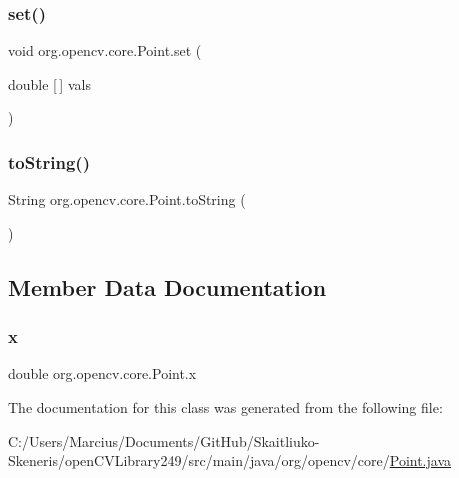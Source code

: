 \mbox{\label{classorg_1_1opencv_1_1core_1_1_point_aee7038884db6b7d0e8d0026836c8a286}} 
\subsubsection{\texorpdfstring{set()}{set()}}
{\footnotesize\ttfamily void org.\+opencv.\+core.\+Point.\+set (\begin{DoxyParamCaption}\item[{double \mbox{[}$\,$\mbox{]}}]{vals }\end{DoxyParamCaption})}

\mbox{\label{classorg_1_1opencv_1_1core_1_1_point_ac99f88cb353d8f6e47f28bd444cf9dec}} 
\subsubsection{\texorpdfstring{to\+String()}{toString()}}
{\footnotesize\ttfamily String org.\+opencv.\+core.\+Point.\+to\+String (\begin{DoxyParamCaption}{ }\end{DoxyParamCaption})}



\subsection{Member Data Documentation}
\mbox{\label{classorg_1_1opencv_1_1core_1_1_point_a90cf386f2b7c3a60e0378f94dcdd252c}} 
\subsubsection{\texorpdfstring{x}{x}}
{\footnotesize\ttfamily double org.\+opencv.\+core.\+Point.\+x}



The documentation for this class was generated from the following file\+:\begin{DoxyCompactItemize}
\item 
C\+:/\+Users/\+Marcius/\+Documents/\+Git\+Hub/\+Skaitliuko-\/\+Skeneris/open\+C\+V\+Library249/src/main/java/org/opencv/core/\mbox{\hyperlink{_point_8java}{Point.\+java}}\end{DoxyCompactItemize}

